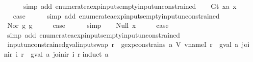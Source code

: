 \begin{isabellebody}
\ \ \ \ \isamarkupfalse%
\ {\isacharparenleft}simp\ add{\isacharcolon}\ enumerate{\isacharunderscore}aexp{\isacharunderscore}inputs{\isacharunderscore}empty{\isacharunderscore}input{\isacharunderscore}unconstrained{\isacharparenright}\isanewline
{}\isamarkupfalse%
\isanewline
\ \ \isamarkupfalse%
\ {\isacharparenleft}Gt\ x{}a\ x{}{\isacharparenright}\isanewline
\ \ \isamarkupfalse%
\ \isamarkupfalse%
\ {\isacharquery}case\isanewline
\ \ \ \ \isamarkupfalse%
\ {\isacharparenleft}simp\ add{\isacharcolon}\ enumerate{\isacharunderscore}aexp{\isacharunderscore}inputs{\isacharunderscore}empty{\isacharunderscore}input{\isacharunderscore}unconstrained{\isacharparenright}\isanewline
{}\isamarkupfalse%
\isanewline
\ \ \isamarkupfalse%
\ {\isacharparenleft}Nor\ g{}\ g{}{\isacharparenright}\isanewline
\ \ \isamarkupfalse%
\ \isamarkupfalse%
\ {\isacharquery}case\isanewline
\ \ \ \ \isamarkupfalse%
\ simp\isanewline
{}\isamarkupfalse%
\isanewline
\ \ \isamarkupfalse%
\ {\isacharparenleft}Null\ x{\isacharparenright}\isanewline
\ \ \isamarkupfalse%
\ \isamarkupfalse%
\ {\isacharquery}case\isanewline
\ \ \ \ \isamarkupfalse%
\ {\isacharparenleft}simp\ add{\isacharcolon}\ enumerate{\isacharunderscore}aexp{\isacharunderscore}inputs{\isacharunderscore}empty{\isacharunderscore}input{\isacharunderscore}unconstrained{\isacharparenright}\isanewline
{}\isamarkupfalse%
%
\endisatagproof
{\isafoldproof}%
%
\isadelimproof
\isanewline
%
\endisadelimproof
\isanewline
{}\isamarkupfalse%
\ input{\isacharunderscore}unconstrained{\isacharunderscore}gval{\isacharunderscore}input{\isacharunderscore}swap{\isacharcolon}\ {\isachardoublequoteopen}{\isasymforall}r{\isachardot}\ {\isasymnot}\ gexp{\isacharunderscore}constrains\ a\ {\isacharparenleft}V\ {\isacharparenleft}vname{\isachardot}I\ r{\isacharparenright}{\isacharparenright}\ {\isasymLongrightarrow}\ {\isacharparenleft}gval\ a\ {\isacharparenleft}join{\isacharunderscore}ir\ i\ r{\isacharparenright}\ {\isacharequal}\ gval\ a\ {\isacharparenleft}join{\isacharunderscore}ir\ i{\isacharprime}\ r{\isacharparenright}{\isacharparenright}{\isachardoublequoteclose}\isanewline
%
\isadelimproof
%
\endisadelimproof
%
\isatagproof
{}\isamarkupfalse%
{\isacharparenleft}induct\ a{\isacharparenright}\isanewline

\end{isabellebody}
